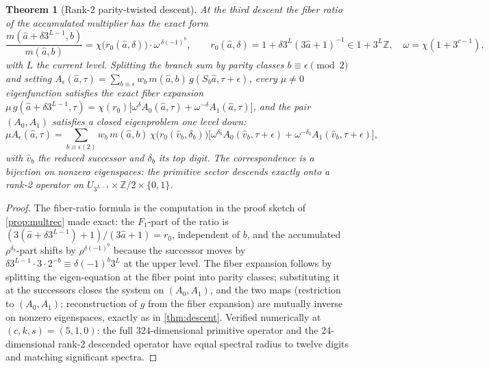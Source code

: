 \documentclass[11pt]{article}
\newcommand{\Z}{\mathbb{Z}}
\theoremstyle{plain}
\newtheorem{theorem}{Theorem}
\theoremstyle{definition}
\theoremstyle{remark}
\begin{document}
\begin{theorem}[Rank-2 parity-twisted descent]\label{thm:rank2}
At the third descent the fiber ratio of the accumulated multiplier has the exact
form
\[
\frac{m(\hat a+\delta3^{L-1},b)}{m(\hat a,b)}
=\chi\bigl(r_0(\hat a,\delta)\bigr)\cdot\omega^{\,\delta(-1)^b},
\qquad
r_0(\hat a,\delta)=1+\delta3^{L}(3\hat a+1)^{-1}\in1+3^{L}\Z,
\quad
\omega=\chi(1+3^{c-1}),
\]
with $L$ the current level. Splitting the branch sum by parity classes
$b\equiv\epsilon\pmod2$ and setting
$A_\epsilon(\hat a,\tau)=\sum_{b\equiv\epsilon}w_b\,m(\hat a,b)\,
g(S_b\hat a,\tau+\epsilon)$, every $\mu\ne0$ eigenfunction satisfies the exact
fiber expansion
$\mu\,g(\hat a+\delta3^{L-1},\tau)
=\chi(r_0)\bigl[\omega^{\delta}A_0(\hat a,\tau)+\omega^{-\delta}A_1(\hat a,\tau)\bigr]$,
and the pair $(A_0,A_1)$ satisfies a closed eigenproblem one level down:
\[
\mu A_\epsilon(\hat a,\tau)=\sum_{b\equiv\epsilon(2)}w_b\,m(\hat a,b)\,
\chi\bigl(r_0(\hat v_b,\delta_b)\bigr)
\bigl[\omega^{\delta_b}A_0(\hat v_b,\tau+\epsilon)
+\omega^{-\delta_b}A_1(\hat v_b,\tau+\epsilon)\bigr],
\]
with $\hat v_b$ the reduced successor and $\delta_b$ its top digit. The
correspondence is a bijection on nonzero eigenspaces: the primitive sector
descends exactly onto a \emph{rank-2} operator on
$U_{3^{L-1}}\times\Z/2\times\{0,1\}$.
\end{theorem}
\begin{proof}
The fiber-ratio formula is the computation in the proof sketch of
\cref{prop:multrec} made exact: the $F_1$-part of the ratio is
$(3(\hat a+\delta3^{L-1})+1)/(3\hat a+1)=r_0$, independent of $b$, and the
accumulated $\rho^{\delta_b}$-part shifts by
$\rho^{\delta(-1)^b}$ because the successor moves by
$\delta3^{L-1}\cdot3\cdot2^{-b}\equiv\delta(-1)^b3^{L}$ at the upper level. The
fiber expansion follows by splitting the eigen-equation at the fiber point into
parity classes; substituting it at the successors closes the system on
$(A_0,A_1)$, and the two maps (restriction to $(A_0,A_1)$; reconstruction of
$g$ from the fiber expansion) are mutually inverse on nonzero eigenspaces,
exactly as in \cref{thm:descent}. Verified numerically at $(c,k,s)=(5,1,0)$:
the full $324$-dimensional primitive operator and the $24$-dimensional rank-2
descended operator have equal spectral radius to twelve digits and matching
significant spectra.
\end{proof}
\end{document}
